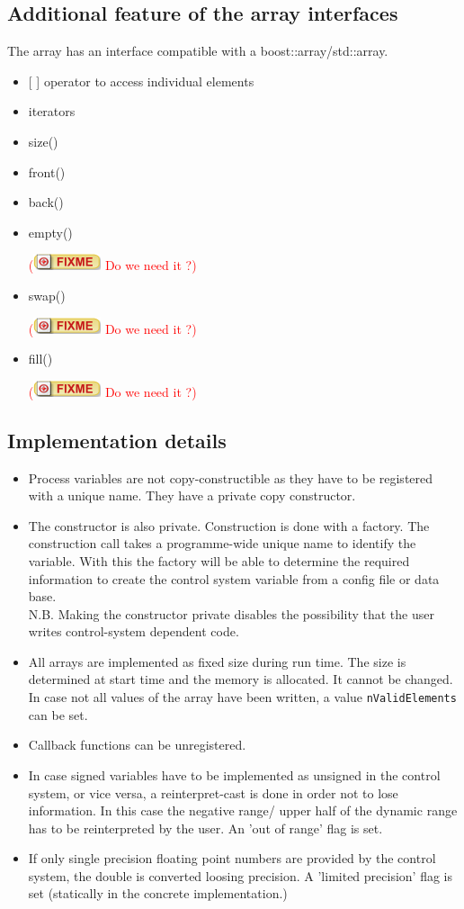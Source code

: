 \documentclass[11pt,a4paper]{scrartcl}
\newcounter{nFixmes}
\newcommand{\fixme}[1]{\addtocounter{nFixmes}{1}\textcolor{red}{(\includegraphics[height=2ex]{fixme} #1)}\xspace}
\begin{document}
\subsection{Additional feature of the array interfaces}
The array has an interface compatible with a boost::array/std::array.
\begin{itemize}
\item {[ ]} operator to access individual elements
\item iterators
\item size()
\item front()
\item back()
\item empty() \fixme{Do we need it ?}
\item swap() \fixme{Do we need it ?}
\item fill() \fixme{Do we need it ?}
\end{itemize}

\subsection{Implementation details}

\begin{itemize}
\item Process variables are not copy-constructible as they have to be
  registered with a unique name. They have a private copy constructor. 
\item The constructor is also private. Construction is done with a
  factory. The construction call takes a programme-wide unique name to
  identify the variable. With this the factory will be able to determine the
  required information to create the control system variable from a config
  file or data base.\\
N.B. Making the constructor private disables the possibility that the user
writes control-system dependent code. 
\item All arrays are implemented as fixed size during run time. The size is 
      determined at start time and the memory is allocated. It cannot be changed.
      In case not all values of the array have been written, a value \texttt{nValidElements}
      can be set.
\item Callback functions can be unregistered.
\item In case signed variables have to be implemented as unsigned in the
  control system, or vice versa, a reinterpret-cast is done in order not to
  lose information. In this case the negative range/ upper half of the dynamic
  range has to be reinterpreted by the user. An 'out of range' flag is set. 
\item If only single precision floating point numbers are provided by the
  control system, the double is converted loosing precision. A 'limited
  precision' flag is set (statically in the concrete implementation.)
\end{itemize}
\end{document}
